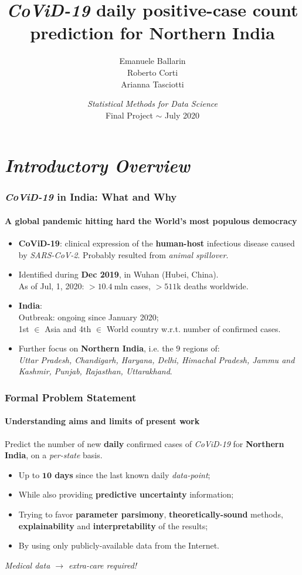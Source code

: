 \documentclass{beamer}
\title[\textit{CoViD-19} daily positive-case count prediction for Northern India]{\textit{CoViD-19} daily positive-case count \\prediction for Northern India}
\author[E. Ballarin $|$ R. Corti $|$ A. Tasciotti]{Emanuele Ballarin \\ Roberto Corti \\ Arianna Tasciotti}
\institute[]{Department of Mathematics and Geosciences, University of Trieste}
\date[]{\textit{Statistical Methods for Data Science}\\ Final Project $\sim$ July 2020}
\begin{document}
\frame{\titlepage}


\section{\textit{Introductory Overview}}{

\begin{frame}
\frametitle{\textit{CoViD-19} in India: What and Why}
\framesubtitle{A global pandemic hitting hard the World's most populous democracy}
\begin{itemize}
	\item{\textbf{CoViD-19}: clinical expression of the \textbf{human-host} infectious disease caused by \textit{SARS-CoV-2}. Probably resulted from \textit{animal spillover}.}
	\item{Identified during \textbf{Dec 2019}, in Wuhan (Hubei, China).\\As of Jul, 1, 2020: $> 10.4\ \text{mln}$ cases, $> 511\text{k}$ deaths worldwide.}
\end{itemize}
\hfill
\begin{itemize}
	\item{\textbf{India}:\\Outbreak: ongoing since January 2020;\\1st $\in$ Asia and 4th $\in$ World country w.r.t. number of confirmed cases.}
	\item{Further focus on \textbf{Northern India}, i.e. the $9$ regions of: \\
	\textit{Uttar Pradesh, Chandigarh, Haryana, Delhi, Himachal Pradesh, Jammu and Kashmir, Punjab, Rajasthan, Uttarakhand}.}
\end{itemize}
\end{frame}

\begin{frame}
	\frametitle{Formal Problem Statement}
	\framesubtitle{Understanding aims and limits of present work}
		Predict the number of new \textbf{daily} confirmed cases of \textit{CoViD-19} for \textbf{Northern India}, on a \textit{per-state} basis.
		\break
		\begin{itemize}
			\item{Up to \textbf{$\textbf{10}$ days} since the last known daily \textit{data-point};}
			\item{While also providing \textbf{predictive uncertainty} information;}
			\item{Trying to favor \textbf{parameter parsimony}, \textbf{theoretically-sound} methods, \textbf{explainability} and \textbf{interpretability} of the results;}
			\item{By using only publicly-available data from the Internet.}
		\end{itemize}
	\hfill

	\textit{Medical data $\rightarrow$ extra-care required!}
\end{frame}
}
\end{document}
